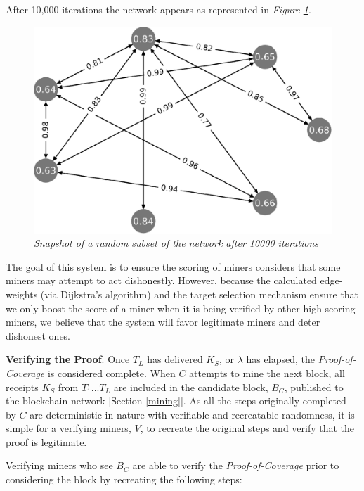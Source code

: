 \documentclass[10pt, nonatbib, nocopyrightspace, reprint]{sigplanconf}
\begin{document}
After 10,000 iterations the network appears as represented in \emph{Figure \ref{fig:score-graph10000}}.

\begin{figure}[H]
    \begin{center}
          \includegraphics[width=0.8\columnwidth]{chart1000.eps}
          \caption{\emph{Snapshot of a random subset of the network after 10000 iterations}}
          \label{fig:score-graph10000}
     \end{center}
\end{figure}

The goal of this system is to ensure the scoring of miners considers that some miners may attempt to act dishonestly. However, because the calculated edge-weights (via Dijkstra's algorithm) and the target selection mechanism ensure that we only boost the score of a miner when it is being verified by other high scoring miners, we believe that the system will favor legitimate miners and deter dishonest ones.

\textbf{Verifying the Proof}. Once $T_L$ has delivered $K_S$, or $\lambda$ has elapsed, the \emph{Proof-of-Coverage} is considered complete. When $C$ attempts to mine the next block, all receipts $K_S$ from $T_1$...$T_L$ are included in the candidate block, $B_C$, published to the blockchain network [Section \ref{mining}]. As all the steps originally completed by $C$ are deterministic in nature with verifiable and recreatable randomness, it is simple for a verifying miners, $V$, to recreate the original steps and verify that the proof is legitimate.

Verifying miners who see $B_C$ are able to verify the \emph{Proof-of-Coverage} prior to considering the block by recreating the following steps:
\end{document}
